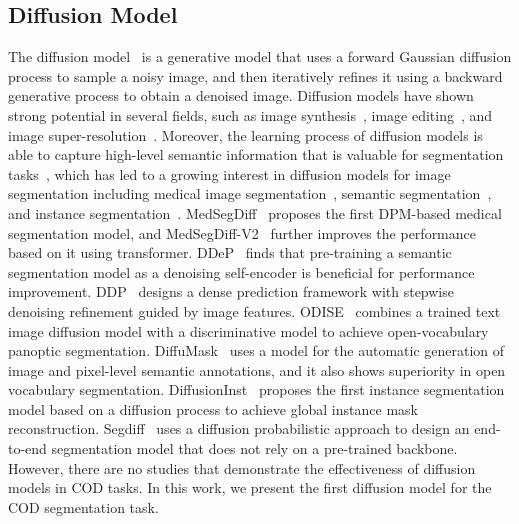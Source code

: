 \documentclass{ecai}
\begin{document}


\subsection{Diffusion Model}
The diffusion model~\cite{ho2020denoising,song2019generative} is a generative model that uses a forward Gaussian diffusion process to sample a noisy image, and then iteratively refines it using a backward generative process to obtain a denoised image. Diffusion models have shown strong potential in several fields, such as image synthesis~\cite{dhariwal2021diffusion,ho2020denoising}, image editing~\cite{hertz2022prompt}, and image super-resolution~\cite{daniels2021score}. Moreover, the learning process of diffusion models is able to capture high-level semantic information that is valuable for segmentation tasks~\cite{baranchuk2021label}, which has led to a growing interest in diffusion models for image segmentation including medical image segmentation~\cite{wu2022medsegdiff,wu2023medsegdiff}, semantic segmentation~\cite{brempong2022denoising,ji2023ddp,wu2023diffumask,xu2023open}, and instance segmentation~\cite{amit2021segdiff,gu2022diffusioninst}. MedSegDiff~\cite{wu2022medsegdiff} proposes the first DPM-based medical segmentation model, and MedSegDiff-V2~\cite{wu2023medsegdiff} further improves the performance based on it using transformer. DDeP~\cite{brempong2022denoising} finds that pre-training a semantic segmentation model as a denoising self-encoder is beneficial for performance improvement. DDP~\cite{ji2023ddp} designs a dense prediction framework with stepwise denoising refinement guided by image features. ODISE~\cite{xu2023open} combines a trained text image diffusion model with a discriminative model to achieve open-vocabulary panoptic segmentation. DiffuMask~\cite{wu2023diffumask} uses a model for the automatic generation of image and pixel-level semantic annotations, and it also shows superiority in open vocabulary segmentation. DiffusionInst~\cite{gu2022diffusioninst} proposes the first instance segmentation model based on a diffusion process to achieve global instance mask reconstruction. Segdiff~\cite{amit2021segdiff} uses a diffusion probabilistic approach to design an end-to-end segmentation model that does not rely on a pre-trained backbone. 
However, there are no studies that demonstrate the effectiveness of diffusion models in COD tasks. In this work, we present the first diffusion model for the COD segmentation task. 
\end{document}
